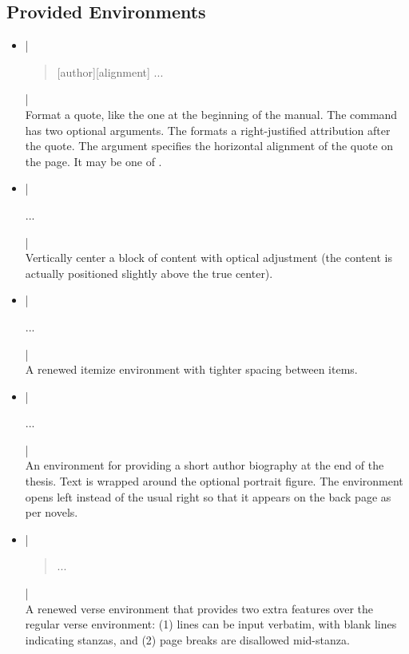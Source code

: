 \documentclass[thesis.tex]{subfiles}
\begin{document}
\subsection*{Provided Environments}
\begin{itemize}
\item \code|\begin{quote}[author][alignment] ... \end{quote}| \\ Format a
quote, like the one at the beginning of the manual. The command has two
optional arguments. The  formats a right-justified attribution
after the quote. The  argument specifies the horizontal
alignment of the quote on the page. It may be one of
.
\item \code|\begin{verticenter} ... \end{verticenter}| \\ Vertically center a
block of content with optical adjustment (the content is actually positioned
slightly above the true center).
\item \code|\begin{tightemize} ... \end{tightemize}| \\ A renewed itemize
environment with tighter spacing between items.
\item \code|\begin{biography} ... \end{biography}| \\ An
environment for providing a short author biography at the end of the thesis.
Text is wrapped around the optional portrait figure. The environment opens left
instead of the usual right so that it appears on the back page as per novels.
\item \code|\begin{verse} ... \end{verse}| \\ A renewed verse environment that
provides two extra features over the regular verse environment: (1) lines can
be input verbatim, with blank lines indicating stanzas, and (2) page breaks are
disallowed mid-stanza.

\end{itemize}
\end{document}
